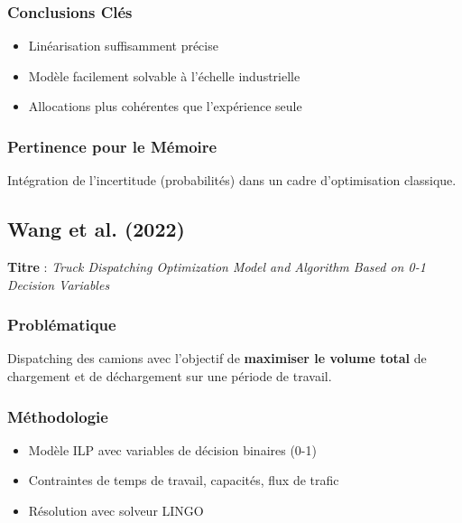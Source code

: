 \documentclass[12pt,a4paper]{article}
\begin{document}
\subsubsection{Conclusions Cl\'es}

\begin{itemize}
    \item Lin\'earisation suffisamment pr\'ecise
    \item Mod\`ele facilement solvable \`a l'\'echelle industrielle
    \item Allocations plus coh\'erentes que l'exp\'erience seule
\end{itemize}

\subsubsection{Pertinence pour le M\'emoire}

Int\'egration de l'incertitude (probabilit\'es) dans un cadre d'optimisation classique.

\subsection{Wang et al. (2022)}

\textbf{Titre} : \textit{Truck Dispatching Optimization Model and Algorithm Based on 0-1 Decision Variables}

\subsubsection{Probl\'ematique}

Dispatching des camions avec l'objectif de \textbf{maximiser le volume total} de chargement et de d\'echargement sur une p\'eriode de travail.

\subsubsection{M\'ethodologie}

\begin{itemize}
    \item Mod\`ele ILP avec variables de d\'ecision binaires (0-1)
    \item Contraintes de temps de travail, capacit\'es, flux de trafic
    \item R\'esolution avec solveur LINGO
\end{itemize}
\end{document}
